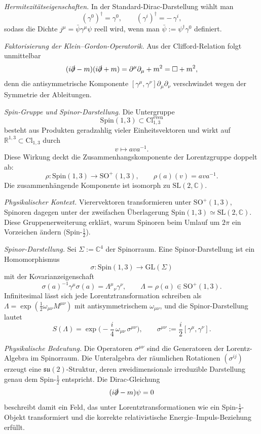\documentclass[10pt, letterpaper]{article}
\newcommand{\R}{\mathbb{R}}
\newcommand{\C}{\mathbb{C}}
\newcommand{\Cl}{\mathrm{Cl}}
\newcommand{\GL}{\mathrm{GL}}
\newcommand{\SL}{\mathrm{SL}}
\newcommand{\SO}{\mathrm{SO}}
\newcommand{\Spin}{\mathrm{Spin}}
\begin{document}
\emph{Hermitezitätseigenschaften.}
In der Standard-Dirac-Darstellung wählt man
\[
(\gamma^0)^\dagger = \gamma^0, \qquad (\gamma^i)^\dagger = -\,\gamma^i ,
\]
sodass die Dichte $j^\mu = \bar\psi \gamma^\mu \psi$ reell wird,
wenn man $\bar\psi := \psi^\dagger \gamma^0$ definiert.

\emph{Faktorisierung der Klein–Gordon-Operatorik.}
Aus der Clifford-Relation folgt unmittelbar
\[
(i\slashed{\partial}-m)(i\slashed{\partial}+m)
= \partial^\mu\partial_\mu + m^2 = \Box + m^2 ,
\]
denn die antisymmetrische Komponente
$[\gamma^\mu,\gamma^\nu]\partial_\mu\partial_\nu$ verschwindet
wegen der Symmetrie der Ableitungen.

\bigskip

\emph{Spin-Gruppe und Spinor-Darstellung.}
Die Untergruppe
\[
\Spin(1,3) \subset \Cl_{1,3}^{\mathrm{even}}
\]
besteht aus Produkten geradzahlig vieler Einheitsvektoren
und wirkt auf $\R^{1,3}\subset\Cl_{1,3}$ durch
\[
v \longmapsto a v a^{-1}.
\]
Diese Wirkung deckt die Zusammenhangskomponente der Lorentzgruppe doppelt ab:
\[
\rho:\Spin(1,3)\to \SO^+(1,3),
\qquad
\rho(a)(v)=a v a^{-1}.
\]
Die zusammenhängende Komponente ist isomorph zu $\SL(2,\C)$.

\emph{Physikalischer Kontext.}
Vierervektoren transformieren unter $\SO^+(1,3)$, Spinoren dagegen unter der
zweifachen Überlagerung $\Spin(1,3)\simeq \SL(2,\C)$.
Diese Gruppenerweiterung erklärt, warum Spinoren beim
Umlauf um $2\pi$ ein Vorzeichen ändern (Spin-$\tfrac12$).

\emph{Spinor-Darstellung.}
Sei $\Sigma := \C^4$ der Spinorraum.
Eine Spinor-Darstellung ist ein Homomorphismus
\[
\sigma:\Spin(1,3)\to \GL(\Sigma)
\]
mit der Kovarianzeigenschaft
\[
\sigma(a)^{-1}\gamma^\mu \sigma(a)
 = \Lambda^\mu{}_\nu \gamma^\nu,
\qquad
\Lambda = \rho(a)\in\SO^+(1,3).
\]
Infinitesimal lässt sich jede Lorentztransformation schreiben als
$\Lambda = \exp(\tfrac12\omega_{\mu\nu}M^{\mu\nu})$
mit antisymmetrischem $\omega_{\mu\nu}$,
und die Spinor-Darstellung lautet
\[
S(\Lambda)
 = \exp\!\Big(-\frac{i}{4}\,\omega_{\mu\nu}\,\sigma^{\mu\nu}\Big),
\qquad
\sigma^{\mu\nu}:=\frac{i}{2}[\gamma^\mu,\gamma^\nu].
\]

\emph{Physikalische Bedeutung.}
Die Operatoren $\sigma^{\mu\nu}$ sind die Generatoren der Lorentz-Algebra
im Spinorraum. Die Unteralgebra der räumlichen Rotationen
$(\sigma^{ij})$ erzeugt eine $\mathfrak{su}(2)$-Struktur,
deren zweidimensionale irreduzible Darstellung genau
dem Spin-$\tfrac12$ entspricht. Die Dirac-Gleichung
\[
(i\slashed{\partial}-m)\psi=0
\]
beschreibt damit ein Feld, das unter Lorentztransformationen
wie ein Spin-$\tfrac12$-Objekt transformiert und die korrekte
relativistische Energie–Impuls-Beziehung erfüllt.
\end{document}
